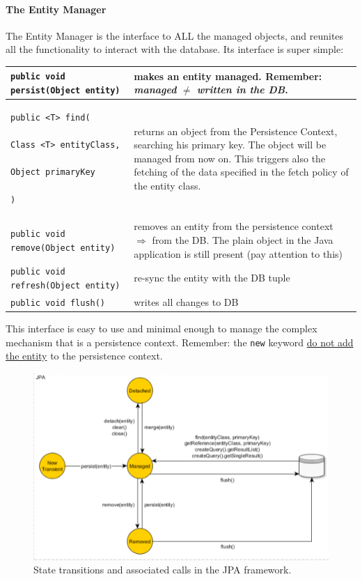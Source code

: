 \documentclass{article}
\begin{document}
				\paragraph{The Entity Manager}
					The Entity Manager is the interface to ALL the managed objects, and reunites all the functionality to interact with the database. Its interface is super simple:
					\begin{center}
						\begin{tabular}{| m{7.5cm} | m{7.5cm} |}
							\hline
							\verb|public void persist(Object entity)| & makes an entity managed. Remember: \textit{managed} $\neq$ \textit{written in the DB}. \\
							\hline
							\begin{verbatim}public <T> find(
								    Class <T> entityClass, 
								    Object primaryKey
								) 
							\end{verbatim}
								& returns an object from the Persistence Context, searching his primary key. The object will be managed from now on. This triggers also the fetching of the data specified in the fetch policy of the entity class. \\
							\hline
							\verb|public void remove(Object entity)| & removes an entity from the persistence context $\Rightarrow$ from the DB. The plain object in the Java application is still present (pay attention to this) \\
							\hline
							\verb|public void refresh(Object entity)| & re-sync the entity with the DB tuple \\
							\hline 
							\verb|public void flush()| & writes all changes to DB \\
							\hline
						\end{tabular}
					\end{center}
					This interface is easy to use and minimal enough to manage the complex mechanism that is a persistence context. Remember: the \verb|new| keyword \underline{do not add the entity} to the persistence context. 
					\begin{figure}[H]
						\centering
						\includegraphics[width = \textwidth]{./images/JPAcalls.png}
						\caption{State transitions and associated calls in the JPA framework.}
					\end{figure}
\end{document}
